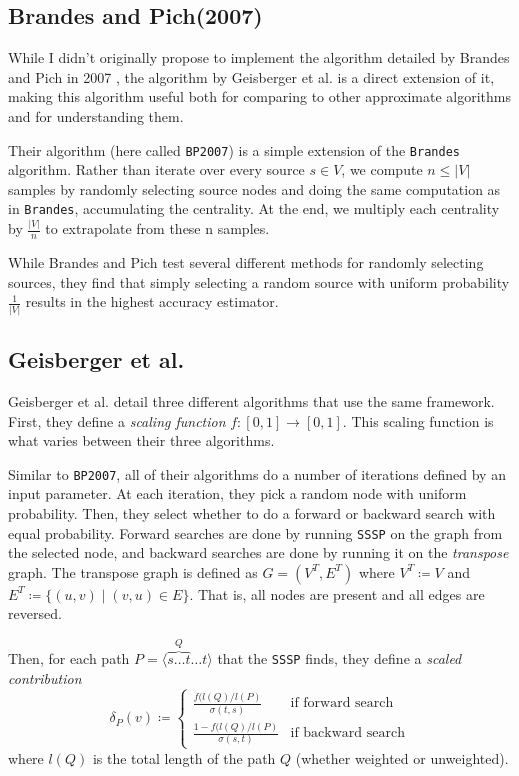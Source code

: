 \documentclass[12pt,a4paper,twoside,openright]{report}
\newcommand{\ttt}[1]{\texttt{#1}}
\begin{document}
	\subsection*{Brandes and Pich(2007)}
	While I didn't originally propose to implement the algorithm detailed by Brandes and Pich in 2007 \cite{brandes2007}, the algorithm by Geisberger et al. is a direct extension of it, making this algorithm useful both for comparing to other approximate algorithms and for understanding them.
	
	Their algorithm (here called \ttt{BP2007}) is a simple extension of the \ttt{Brandes} algorithm. Rather than iterate over every source $s \in V$, we compute $n \leq |V|$ samples by randomly selecting source nodes and doing the same computation as in \ttt{Brandes}, accumulating the centrality. At the end, we multiply each centrality by $\frac{|V|}{n}$ to extrapolate from these n samples.
	
	While Brandes and Pich test several different methods for randomly selecting sources, they find that simply selecting a random source with uniform probability $\frac{1}{|V|}$ results in the highest accuracy estimator.
	
	\subsection{Geisberger et al.} \label{sec:geisberger}
	Geisberger et al. detail three different algorithms that use the same framework. First, they define a \textit{scaling function} $f \colon [0,1] \rightarrow [0,1]$. This scaling function is what varies between their three algorithms.
	
	 Similar to \ttt{BP2007}, all of their algorithms do a number of iterations defined by an input parameter. At each iteration, they pick a random node with uniform probability. Then, they select whether to do a forward or backward search with equal probability. Forward searches are done by running \ttt{SSSP} on the graph from the selected node, and backward searches are done by running it on the \textit{transpose} graph. The transpose graph is defined as $G = (V^T,E^T)$ where $V^T \coloneqq V$ and $E^T \coloneqq \{(u,v) \mid (v,u) \in E \}$. That is, all nodes are present and all edges are reversed.
	
	Then, for each path $P = \langle \overbrace{s \dots t}^Q \dots t\rangle$ that the \ttt{SSSP} finds, they define a \textit{scaled contribution}
	\begin{equation}
	\delta_P(v) \coloneqq \left\{
	\begin{array}{ll}
	\frac{f(l(Q)/l(P)}{\sigma(t,s)} & \text{if forward search}\\
	\frac{1-f(l(Q)/l(P)}{\sigma(s,t)} & \text{if backward search}
	\end{array}
	\right.
	\end{equation}
	where $l(Q)$ is the total length of the path $Q$ (whether weighted or unweighted).
	
\end{document}
